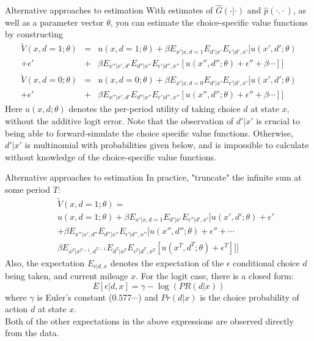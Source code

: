 \documentclass[aspectratio=169,11pt]{beamer}
\begin{document}
\begin{frame}{Alternative approaches to estimation}
With estimates of $\hat G (\cdot | \cdot)$ and $\hat p (\cdot .  \cdot)$, as well as a parameter vector $\theta$, you can \alert{estimate} the choice-specific value functions by constructing  
\begin{eqnarray*}
\tilde V(x, d =1 ;\theta) &= & u(x, d=1; \theta) + \beta E_{x'|x, d=1} E_{d'|x'} E_{\epsilon '| d', x'} [ u(x', d' ;\theta)\\ 
+ \epsilon' &+&  \beta E_{x''|x', d'} E_{d''|x''} E_{\epsilon'|d'', x''} [ u(x'', d'';\theta) + \epsilon'' + \beta \cdots ] ] \\
\tilde V(x, d =0 ;\theta) &= & u(x, d=0; \theta) + \beta E_{x'|x, d=0} E_{d'|x'} E_{\epsilon '| d', x'} [ u(x', d' ;\theta)  \\
+ \epsilon' &+& \beta E_{x''|x', d'} E_{d''|x''} E_{\epsilon'|d'', x''} [ u(x'', d'';\theta) + \epsilon'' + \beta \cdots ] ]
\end{eqnarray*}
Here $u(x, d;\theta)$ denotes the per-period utility of taking choice $d$ at state $x$, \alert{without} the additive logit error. Note that the observation of $d'|x'$ is crucial to being able to forward-simulate the \alert{choice specific value functions}. Otherwise, $d'|x'$ is multinomial with probabilities given below, and is impossible to calculate without knowledge of the choice-specific value functions. 
\end{frame}


\begin{frame}{Alternative approaches to estimation}
In practice, "truncate" the infinite sum at some period $T$: 
\begin{eqnarray*} 
&& \tilde V(x, d=1;\theta) =\\
&& u(x, d=1; \theta) + \beta E_{x'|x, d=1} E_{d'|x'} E_{\epsilon''|d', x'} [u(x', d';\theta) + \epsilon' \\
&& + \beta E_{x''|x', d''} E_{d''|x''} E_{\epsilon'|d'', x''} [u(x'', d'';\theta) + \epsilon'' + \cdots \\
&& \beta E_{x^T|x^{T-1}, d^{T-1}} E_{d^T|x^T} E_{\epsilon^T|d^T, x^T} [u(x^T, d^T;\theta) + \epsilon^T ]]]
\end{eqnarray*}
Also, the expectation $E_{\epsilon|d, x}$ denotes the expectation of the $\epsilon$ conditional choice $d$ being taken, and current mileage $x$. For the logit case, there is a closed form:
$$ E[\epsilon | d, x] = \gamma - \log(PR(d|x))$$
where $\gamma$ is Euler's constant ($0.577\cdots$) and $Pr(d|x)$ is the choice probability of action $d$ at state $x$. \\
\vspace{2mm}
Both of the other expectations in the above expressions are observed directly from the data. 
\end{frame}
\end{document}
